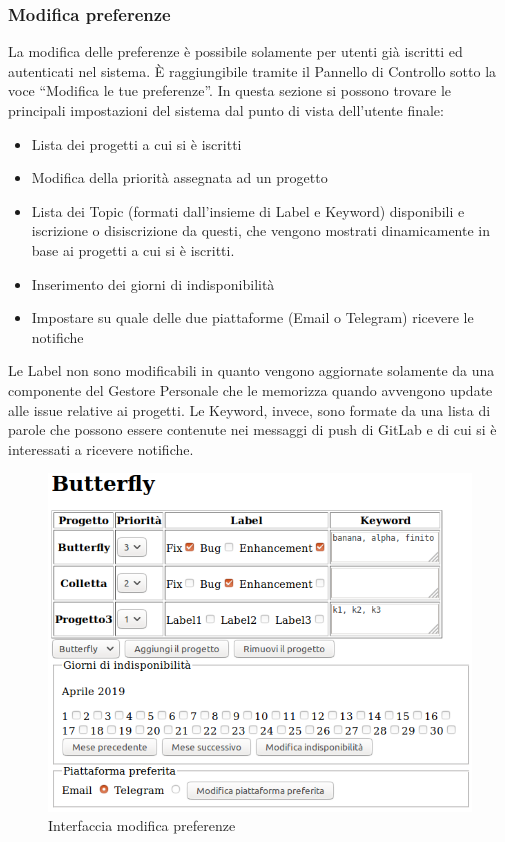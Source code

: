 \subsubsection{Modifica preferenze}\label{preferenze}
La modifica delle preferenze è possibile solamente per utenti già iscritti ed autenticati nel sistema.
È raggiungibile tramite il Pannello di Controllo sotto la voce ``Modifica le tue preferenze''.
In questa sezione si possono trovare le principali impostazioni del sistema dal punto di vista dell'utente finale:
\begin{itemize}
	\item Lista dei progetti a cui si è iscritti
	\item Modifica della priorità assegnata ad un progetto
	\item Lista dei Topic (formati dall'insieme di Label e Keyword) disponibili e iscrizione o disiscrizione da questi, che vengono mostrati dinamicamente in base ai progetti a cui si è iscritti.
	\item Inserimento dei giorni di indisponibilità
	\item Impostare su quale delle due piattaforme (Email o Telegram) ricevere le notifiche
\end{itemize}
Le Label non sono modificabili in quanto vengono aggiornate solamente da una componente del Gestore Personale che le memorizza quando avvengono update alle issue relative ai progetti.
Le Keyword, invece, sono formate da una lista di parole che possono essere contenute nei messaggi di push di GitLab e di cui si è interessati a ricevere notifiche.
\begin{figure}[H]
	\centering
	\includegraphics[width=12cm]{img/preferenze_1.png}
	\caption{Interfaccia modifica preferenze}
\end{figure}

